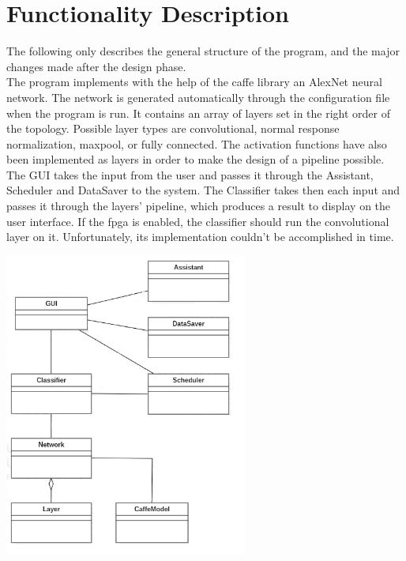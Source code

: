 \documentclass[parskip=full]{scrartcl}
\begin{document}
\section {Functionality Description}
The following only describes the general structure of the program, and the major changes made after the design phase.\\
The program implements with the help of the caffe library an AlexNet neural network. The network is generated automatically through the configuration file when the program is run. It contains an array of layers set in the right order of the topology. Possible layer types are convolutional, normal response normalization, maxpool, or  fully connected. The activation functions have also been implemented as layers in order to make the design of a pipeline possible.  \\
The GUI takes the input from the user and passes it through the Assistant, Scheduler and DataSaver to the system. The Classifier takes then each input and passes it through the layers' pipeline, which produces a result to display on the user interface.
If the fpga is enabled, the classifier should run the convolutional layer on it. Unfortunately, its implementation couldn't be accomplished in time. 


\includegraphics[width=0.60\textwidth, center]{diagram}

\pagebreak
\end{document}
